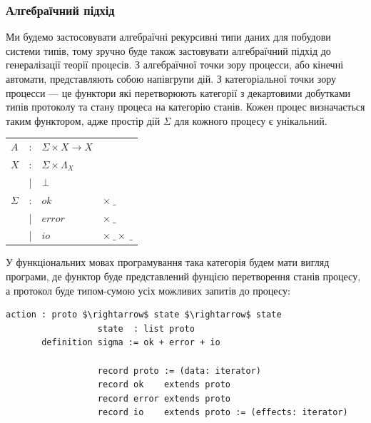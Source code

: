 \documentclass[11pt,oneside]{article}
\begin{document}
\newpage
   \subsubsection{Алгебраїчний підхід}

   Ми будемо застосовувати алгебраїчні рекурсивні типи даних для побудови системи типів, тому
   зручно буде також застовувати алгебраїчний підхід до генералізації теорії процесів.
   З алгебраїчної точки зору процесси, або кінечні автомати, представляють собою напівгрупи дій.
   З категоріальної точки зору процесси --- це функтори які перетворюють категорії з декартовими добутками
   типів протоколу та стану процеса на категорію станів. Кожен процес визначається таким функтором, адже
   простір дій $\Sigma$ для кожного процесу є унікальний.

\begin{center}
\begin{tabular}{lcll}
$A$         &:& $\Sigma \times X \rightarrow X  $ &\\
$X$         &:& $\Sigma \times \Lambda_{X} $ &\\
            &|& $\bot                              $ &\\
$\Sigma$    &:& $ok$    & $\times\ \_$          \\
            &|& $error$ & $\times\ \_$          \\
            &|& $io$    & $\times\ \_ \times\ \_$          \\
\end{tabular}
\end{center}

   У функціональних мовах програмування така категорія будем мати вигляд програми,
   де функтор буде представлений фунцією перетворення станів процесу, а протокол
   буде типом-сумою усіх можливих запитів до процесу:

\begin{center}
\begin{lstlisting}[mathescape=true]
                  action : proto $\rightarrow$ state $\rightarrow$ state
                  state  : list proto
       definition sigma := ok + error + io

                  record proto := (data: iterator)
                  record ok    extends proto
                  record error extends proto
                  record io    extends proto := (effects: iterator)
\end{lstlisting}
\end{center}
\end{document}
